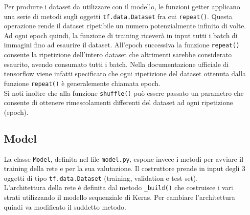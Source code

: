 Per produrre i dataset da utilizzare con il modello, le funzioni getter applicano una serie di metodi sugli oggetti \texttt{tf.data.Dataset} fra cui \texttt{repeat()}. Questa operazione rende il dataset ripetibile un numero potenzialmente infinito di volte. Ad ogni epoch quindi, la funzione di training riceverà in input tutti i batch di immagini fino ad esaurire il dataset. All'epoch successiva la funzione \texttt{repeat()} consente la ripetizione dell'intero dataset che altrimenti sarebbe considerato esaurito, avendo consumato tutti i batch. Nella documentazione ufficiale di tensorflow viene infatti specificato che ogni ripetizione del dataset ottenuta dalla funzione \texttt{repeat()} è generalemente chiamata epoch\cite{repeatshuffle}.\\
Si noti inoltre che alla funzione \texttt{shuffle()} può essere passato un parametro che consente di ottenere rimescolamenti differenti del dataset ad ogni ripetizione (epoch).

\subsection{Model}

La classe \texttt{Model}, definita nel file \texttt{model.py}, espone invece i metodi per avviare il training della rete e per la sua valutazione. Il costruttore prende in input degli 3 oggetti di tipo \texttt{tf.data.Dataset} (training, validation e test set).\\ L'architettura della rete è definita dal metodo \texttt{\_build()} che costruisce i vari strati utilizzando il modello sequenziale di \gls{Keras}. Per cambiare l'architettura quindi va modificato il suddetto metodo.\\

